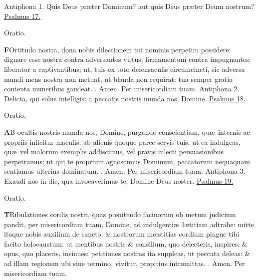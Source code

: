 \documentclass[letter,11pt]{book}
\makeatletter
\DeclareRobustCommand{\Rbar}{\vers@resp{0pt}{R}}
\newcommand{\vers@resp@sym}{\raisebox{0.2ex}{\rotatebox[origin=c]{-20}{$\m@th\rceil$}}}
\newcommand{\vers@resp}[2]{%
  {\ooalign{\hidewidth\kern#1\vers@resp@sym\hidewidth\cr#2\cr}}%
}%
\def\R{\color{Red} \Rbar . \color{black}}
\makeatother
\begin{document}
\begin{multicols*}{2}
\newline \color{Red} Antiphona 1. \color{black} Quis Deus pr\ae ter Dominum? aut quis Deus pr\ae ter Deum nostrum? \color{Red} \hyperlink{ps17}{Psalmus 17.} \color{black}
\vspace{-.5em} \begin{center} \color{Red} Oratio. \color{black} \end{center} \vspace{-.5em}
\lettrine[lines=2]{\bfseries \color{Red} F}{}Ortitudo nostra, dona nobis dilectionem tui nominis perpetim possidere: dignare esse nostra contra adversantes virtus: firmamentum contra impugnantes: liberator a captivantibus; ut, tuis ex toto defensaculis circumcincti, sic adversa mundi mens nostra non metuat, ut blanda non requirat: tua semper gratia contenta muneribus gaudeat. \R Amen. Per misericordiam tuam.
\newline \color{Red} Antiphona 2. \color{black} Delicta, qui solus intelligis: a peccatis nostris munda nos, Domine. \color{Red} \hyperlink{ps18}{Psalmus 18.} \color{black}
\vspace{-.5em} \begin{center} \color{Red} Oratio. \color{black} \end{center} \vspace{-.5em}
\lettrine[lines=2]{\bfseries \color{Red} A}{}B ocultis nostris munda nos, Domine, purgando conscientiam, qu\ae \ internis ac propriis inficitur maculis: ab alienis quoque parce servis tuis, ut ea indulgeas, qu\ae \ vel malorum exemplis addiscimus, vel pravis inlecti persuasionibus perpetramus; ut qui te proprium agnoscimus Dominum, peccatorum nequaquam sentiamus ulterius dominatum. \R Amen. Per misericordiam tuam.
\newline \color{Red} Antiphona 3. \color{black} Exaudi nos in die, qua invocaverimus te, Domine Deus noster. \color{Red} \hyperlink{ps19}{Psalmus 19.} \color{black}
\vspace{-.5em} \begin{center} \color{Red} Oratio. \color{black} \end{center} \vspace{-.5em}
\lettrine[lines=2]{\bfseries \color{Red} T}{}Ribulationes cordis nostri, quas p\oe nitendo facinorum ob metum judicium pandit, per misericordiam tuam, Domine, ad indulgenti\ae \ l\ae titiam adtrahe: mitte itaque nobis auxilium de sancto; \& nostrorum m\oe stitias cordium pingue tibi facito holocaustum: ut mentibus nostris \& consilium, quo delecteris, inspires; \& opus, quo placeris, insinues: petitiones nostras ita suppleas, ut peccata deleas: \& ad illam regionem ubi sine termino, vivitur, propitius intromittas. \R Amen. Per misericordiam tuam.

\end{multicols*}
\end{document}
